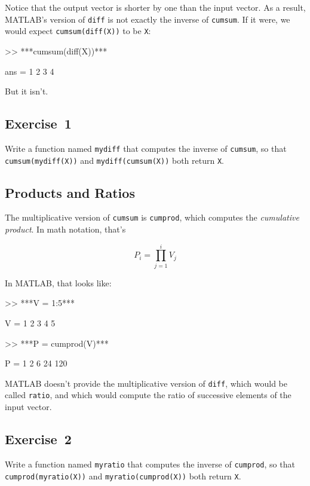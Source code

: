 Notice that the output vector is shorter by one than the input
vector.  As a result, MATLAB's version of \lstinline{diff} is not
exactly the inverse of \lstinline{cumsum}.  If it were, we would
expect \lstinline{cumsum(diff(X))} to be \lstinline{X}:

\begin{code}
>> ***cumsum(diff(X))***

ans = 1     2     3     4
\end{code}

But it isn't.

\subsection{Exercise~1}
Write a function named \lstinline{mydiff} that computes the
inverse of \lstinline{cumsum}, so that \lstinline{cumsum(mydiff(X))} and
\lstinline{mydiff(cumsum(X))} both return \lstinline{X}.



\subsection{Products and Ratios}

The multiplicative version of \lstinline{cumsum} is \lstinline{cumprod},
which computes the \emph{cumulative product}.  In math notation,
that's


\begin{equation*}
P_i = \prod_{j=1}^i V_j
\end{equation*}

In MATLAB, that looks like:

\begin{code}
>> ***V = 1:5***

V = 1     2     3     4     5

>> ***P = cumprod(V)***

P = 1     2     6    24   120
\end{code}

MATLAB doesn't provide the multiplicative version
of \lstinline{diff}, which would be called \lstinline{ratio}, and which would
compute the ratio of successive elements of the input vector.

\subsection{Exercise~2}
Write a function named \lstinline{myratio} that computes the
inverse of \lstinline{cumprod}, so that \lstinline{cumprod(myratio(X))} and
\lstinline{myratio(cumprod(X))} both
return \lstinline{X}.

